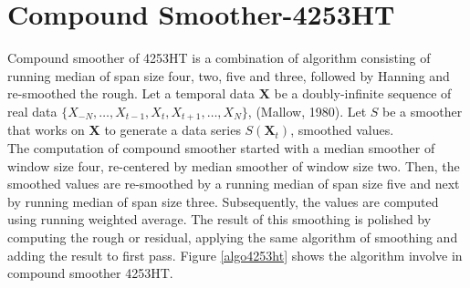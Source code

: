 \documentclass[12pt, a4paper]{report}
\begin{document}
\section{Compound Smoother-4253HT}

Compound smoother of 4253HT is a combination of algorithm consisting of running median of span size four, two, five and three, followed by Hanning and re-smoothed the rough. 
Let a temporal data $\textbf{X}$ be a doubly-infinite sequence of real data $\{X_{-N}, \ldots, X_{t-1}, X_{t},X_{t+1},\ldots, X_{N}\}$, (Mallow, 1980). Let $S$ be a smoother that works on \textbf{X} to generate a data series $S(\textbf{X}_{t})$, smoothed values.\\

The computation of compound smoother started with a median smoother of window size four, re-centered by median smoother of window size two. Then, the smoothed values are re-smoothed by a running
median of span size five and next by running median of span size three. Subsequently, the values
are computed using running weighted average. The
result of this smoothing is polished by computing the rough or residual, applying
the same algorithm of smoothing and adding the result to first pass. Figure \ref{algo4253ht} shows the algorithm involve in compound smoother 4253HT.\\
\end{document}
